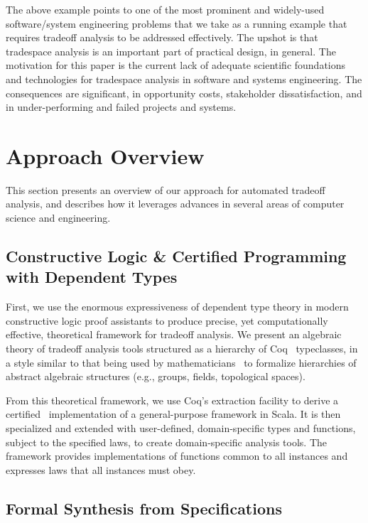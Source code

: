 \documentclass[10pt,conference]{IEEEtran}
\begin{document}
The above example points to one of the most prominent and widely-used software/system engineering problems that we take as a running example that requires tradeoff analysis to be addressed effectively. The upshot is that tradespace analysis is an important part of practical design, in general. The motivation for this paper is the current lack of adequate scientific foundations and technologies for tradespace analysis in software and systems engineering. The consequences are significant, in opportunity costs, stakeholder dissatisfaction, and in under-performing and failed projects and systems.

\section{Approach Overview}
\label{approach}

This section presents an overview of our approach for automated tradeoff analysis, and describes how it leverages advances in several areas of computer science and engineering.

\subsection{Constructive Logic \& Certified Programming with Dependent Types}
First, we use the enormous expressiveness of dependent type theory in modern constructive logic proof assistants to produce %
precise, yet computationally effective, theoretical framework for tradeoff analysis. 
We present an algebraic theory of tradeoff analysis tools structured as a hierarchy of Coq~\cite{coq_book} typeclasses, in a style similar to that being used by mathematicians~\cite{spitters2011type, pelayo2014homotopy} to formalize hierarchies of abstract algebraic structures (e.g., groups, fields, topological spaces).

From this theoretical framework, we use Coq's extraction facility to derive a certified~\cite{chlipala2013certified} implementation of a general-purpose framework in Scala. It is then specialized and extended with user-defined, domain-specific types and functions, subject to the specified laws, to create domain-specific analysis tools. The framework provides implementations of functions common to all instances and expresses laws that all instances must obey.

\subsection{Formal Synthesis from Specifications}
\end{document}
